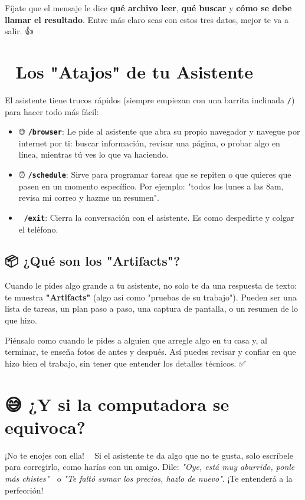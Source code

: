 \documentclass[12pt]{article}
\begin{document}
Fíjate que el mensaje le dice \textbf{qué archivo leer}, \textbf{qué buscar} y \textbf{cómo se debe llamar el resultado}. Entre más claro seas con estos tres datos, mejor te va a salir. 👍

\newpage
\section{🚀 Los "Atajos" de tu Asistente}
El asistente tiene trucos rápidos (siempre empiezan con una barrita inclinada \texttt{/}) para hacer todo más fácil:
\begin{itemize}
    \item 🌐 \textbf{\texttt{/browser}}: Le pide al asistente que abra su propio navegador y navegue por internet por ti: buscar información, revisar una página, o probar algo en línea, mientras tú ves lo que va haciendo. 👀
    \item ⏰ \textbf{\texttt{/schedule}}: Sirve para programar tareas que se repiten o que quieres que pasen en un momento específico. Por ejemplo: "todos los lunes a las 8am, revisa mi correo y hazme un resumen". 📅
    \item 🚪 \textbf{\texttt{/exit}}: Cierra la conversación con el asistente. Es como despedirte y colgar el teléfono. 👋
\end{itemize}

\subsection{📦 ¿Qué son los "Artifacts"?}
Cuando le pides algo grande a tu asistente, no solo te da una respuesta de texto: te muestra \textbf{"Artifacts"} (algo así como "pruebas de su trabajo"). Pueden ser una lista de tareas, un plan paso a paso, una captura de pantalla, o un resumen de lo que hizo. 🧾

Piénsalo como cuando le pides a alguien que arregle algo en tu casa y, al terminar, te enseña fotos de antes y después. Así puedes revisar y confiar en que hizo bien el trabajo, sin tener que entender los detalles técnicos. ✅

\newpage
\section{😅 ¿Y si la computadora se equivoca?}
¡No te enojes con ella! 🧘‍♀️ Si el asistente te da algo que no te gusta, solo escríbele para corregirlo, como harías con un amigo. Dile: \textit{"Oye, está muy aburrido, ponle más chistes"} 🤡 o \textit{"Te faltó sumar los precios, hazlo de nuevo"}. ¡Te entenderá a la perfección!
\end{document}
